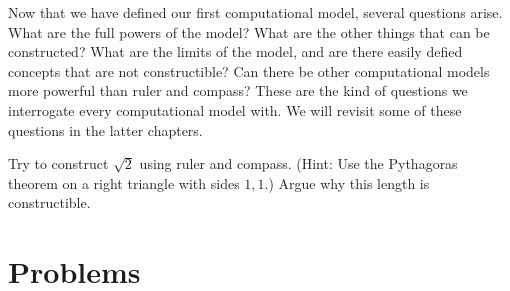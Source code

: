 Now that we have defined our first computational model, several questions arise. What are the full powers of the model? What are the other things that can be constructed? What are the limits of the model, and are there easily defied concepts that are not constructible? Can there be other computational models more powerful than ruler and compass?  These are the kind of questions we interrogate every computational model with. We will revisit some of these questions in the latter chapters.

\begin{exercise}
\label{exer:squarerootof2}
 Try to construct $\sqrt{2}$ using ruler and compass. (Hint: Use the Pythagoras theorem 
  on a right triangle with sides $1, 1$.) Argue why this length is constructible.
  \label{exer:sqrt2}
\end{exercise}


\section*{Problems}

